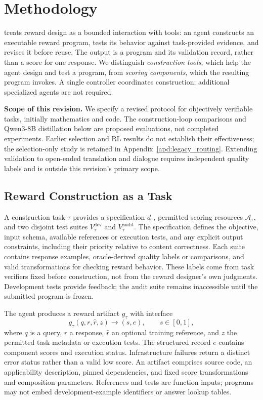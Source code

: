 \section{Methodology}
\label{sec:method}

\method{} treats reward design as a bounded interaction with tools: an agent constructs an executable reward program, tests its behavior against task-provided evidence, and revises it before reuse. The output is a program and its validation record, rather than a score for one response. We distinguish \emph{construction tools}, which help the agent design and test a program, from \emph{scoring components}, which the resulting program invokes. A single controller coordinates construction; additional specialized agents are not required.

\noindent\textbf{Scope of this revision.} We specify a revised protocol for objectively verifiable tasks, initially mathematics and code. The construction-loop comparisons and Qwen3-8B distillation below are proposed evaluations, not completed experiments. Earlier selection and RL results do not establish their effectiveness; the selection-only study is retained in Appendix~\ref{apd:legacy_routing}. Extending validation to open-ended translation and dialogue requires independent quality labels and is outside this revision's primary scope.

\subsection{Reward Construction as a Task}
\label{sec:formulation}

A construction task $\tau$ provides a specification $d_\tau$, permitted scoring resources $\mathcal{A}_\tau$, and two disjoint test suites $V_\tau^{\mathrm{dev}}$ and $V_\tau^{\mathrm{audit}}$. The specification defines the objective, input schema, available references or execution tests, and any explicit output constraints, including their priority relative to content correctness. Each suite contains response examples, oracle-derived quality labels or comparisons, and valid transformations for checking reward behavior. These labels come from task verifiers fixed before construction, not from the reward designer's own judgments. Development tests provide feedback; the audit suite remains inaccessible until the submitted program is frozen.

The agent produces a reward artifact $g_\tau$ with interface
\begin{equation}
    g_\tau(q,r,\hat r,z) \longrightarrow (s,e),
    \qquad s\in[0,1],
\end{equation}
where $q$ is a query, $r$ a response, $\hat r$ an optional training reference, and $z$ the permitted task metadata or execution tests. The structured record $e$ contains component scores and execution status. Infrastructure failures return a distinct error status rather than a valid low score. An artifact comprises source code, an applicability description, pinned dependencies, and fixed score transformations and composition parameters. References and tests are function inputs; programs may not embed development-example identifiers or answer lookup tables.

